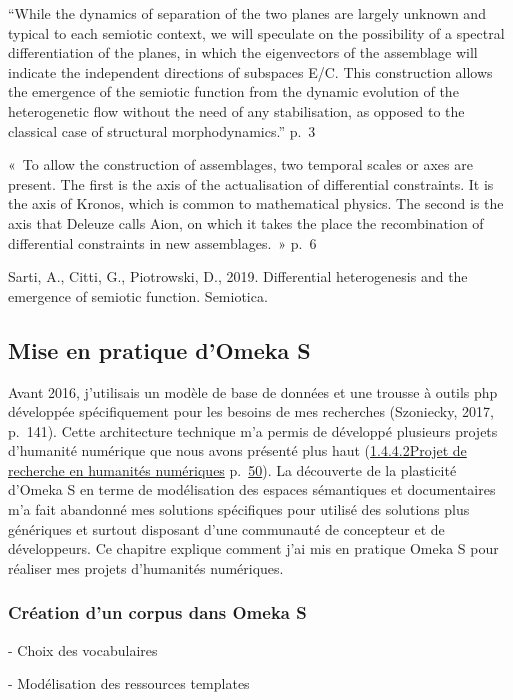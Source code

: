 \documentclass[
  a4paper,
  DIV=11,
  numbers=noendperiod]{scrreprt}
\begin{document}
``While the dynamics of separation of the two planes are largely unknown
and typical to each semiotic context, we will speculate on the
possibility of a spectral differentiation of the planes, in which the
eigenvectors of the assemblage will indicate the independent directions
of subspaces E/C. This construction allows the emergence of the semiotic
function from the dynamic evolution of the heterogenetic flow without
the need of any stabilisation, as opposed to the classical case of
structural morphodynamics.'' p.~3

«~To allow the construction of assemblages, two temporal scales or axes
are present. The first is the axis of the actualisation of differential
constraints. It is the axis of Kronos, which is common to mathematical
physics. The second is the axis that Deleuze calls Aion, on which it
takes the place the recombination of differential constraints in new
assemblages.~» p.~6

Sarti, A., Citti, G., Piotrowski, D., 2019. Differential heterogenesis
and the emergence of semiotic function. Semiotica.

\subsection{Mise en pratique d'Omeka S}\label{sec-pratiquesOmk}

Avant 2016, j'utilisais un modèle de base de données et une trousse à
outils php développée spécifiquement pour les besoins de mes recherches
(Szoniecky, 2017, p.~141). Cette architecture technique m'a permis de
développé plusieurs projets d'humanité numérique que nous avons présenté
plus haut (\hyperref[anchor-59]{1.4.4.2Projet de recherche en humanités
numériques} p.~\hyperref[anchor-59]{50}). La découverte de la plasticité
d'Omeka S en terme de modélisation des espaces sémantiques et
documentaires m'a fait abandonné mes solutions spécifiques pour utilisé
des solutions plus génériques et surtout disposant d'une communauté de
concepteur et de développeurs. Ce chapitre explique comment j'ai mis en
pratique Omeka S pour réaliser mes projets d'humanités numériques.

\subsubsection{Création d'un corpus dans Omeka
S}\label{cruxe9ation-dun-corpus-dans-omeka-s}

- Choix des vocabulaires

- Modélisation des ressources templates
\end{document}
